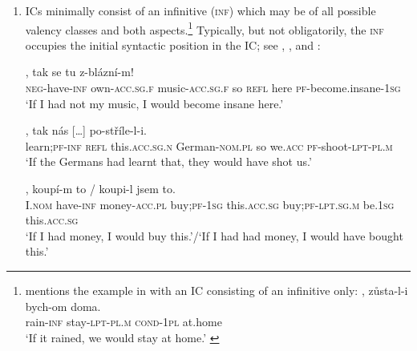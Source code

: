 \documentclass[output=paper,colorlinks,citecolor=brown,
modfonts,newtxmath
]{langscibook}
\begin{document}
\begin{enumerate}

\item ICs minimally consist of an infinitive (\textsc{inf}) which may be of all possible valency classes and both aspects.\footnote{\citet{Svoboda1959} mentions the example in  with an IC consisting of an infinitive only:
\ea\label{ex:rain}
, zůsta-l-i bych-om doma.\\
     {} rain-\textsc{inf} stay-\textsc{lpt-pl.m} \textsc{cond-1pl} {at.home}\\
\glt `If it rained, we would stay at home.' \hfill \citep[Czech;][167]{Svoboda1959} 
\z} 
Typically, but not obligatorily, the \textsc{inf} occupies the initial syntactic position in the IC; see , , and :

\ea\label{ex:music}
, tak se tu z-blázní-m!\\
     {} \textsc{neg}-have-\textsc{inf} own-\textsc{acc.sg.f} music-\textsc{acc.sg.f} so \textsc{refl} here \textsc{pf}-{become.insane}-\textsc{1sg}\\
\glt `If I had not my music, I would become insane here.' \\ \hfill \citep[Czech;][4]{Milotova2012}
\z

\ea\label{ex:Germans}
, tak nás {[\ldots]}\hspace{-2pt} po-stříle-l-i.\\ 
     {} learn;\textsc{pf}-\textsc{inf} \textsc{refl} this.\textsc{acc.sg.n} German-\textsc{nom.pl} so we.\textsc{acc} {} \textsc{pf}-shoot-\textsc{lpt-pl.m}\\
\glt `If the Germans had learnt that, they would have shot us.' \\ \hfill \citep[Czech;][371]{Meyer2010}
\z

\ea\label{ex:money}
, koupí-m to / koupi-l jsem to.\\ 
     {} I.\textsc{nom} have-\textsc{inf} money-\textsc{acc.pl} buy;\textsc{pf}-\textsc{1sg} this.\textsc{acc.sg} {} buy;\textsc{pf}-\textsc{lpt.sg.m} be.\textsc{1sg} this.\textsc{acc.sg}\\
\glt `If I had money, I would buy this.'/`If I had had money, I would have bought this.' \hfill \citep[Czech;][683]{Travnicek1951}
\z


\end{enumerate}
\end{document}
